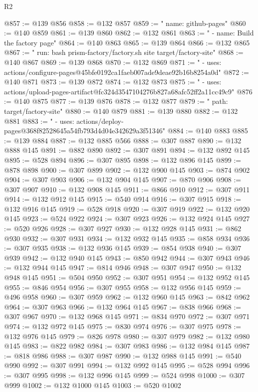\begin{lexlean}{R2}
\begin{coremodule}
@857 := @139 @856
@858 := @132 @857
@859 := "      name: github-pages"
@860 := @140 @859
@861 := @139 @860
@862 := @132 @861
@863 := "      - name: Build the factory page"
@864 := @140 @863
@865 := @139 @864
@866 := @132 @865
@867 := "        run: bash prism-factory/factory.sh site target/factory-site"
@868 := @140 @867
@869 := @139 @868
@870 := @132 @869
@871 := "      - uses: actions/configure-pages@45bfe0192ca1faeb007ade9deae92b16b8254a0d"
@872 := @140 @871
@873 := @139 @872
@874 := @132 @873
@875 := "      - uses: actions/upload-pages-artifact@fc324d3547104276b827a68afc52ff2a11cc49c9"
@876 := @140 @875
@877 := @139 @876
@878 := @132 @877
@879 := "          path: target/factory-site"
@880 := @140 @879
@881 := @139 @880
@882 := @132 @881
@883 := "      - uses: actions/deploy-pages@368f82528645a54fb793d4d04e342629a3f51346"
@884 := @140 @883
@885 := @139 @884
@887 := @132 @885 @566
@888 := @307 @887
@890 := @132 @888 @145
@891 := @882 @890
@892 := @307 @891
@894 := @132 @892 @145
@895 := @528 @894
@896 := @307 @895
@898 := @132 @896 @145
@899 := @878 @898
@900 := @307 @899
@902 := @132 @900 @145
@903 := @874 @902
@904 := @307 @903
@906 := @132 @904 @145
@907 := @870 @906
@908 := @307 @907
@910 := @132 @908 @145
@911 := @866 @910
@912 := @307 @911
@914 := @132 @912 @145
@915 := @540 @914
@916 := @307 @915
@918 := @132 @916 @145
@919 := @528 @918
@920 := @307 @919
@922 := @132 @920 @145
@923 := @524 @922
@924 := @307 @923
@926 := @132 @924 @145
@927 := @520 @926
@928 := @307 @927
@930 := @132 @928 @145
@931 := @862 @930
@932 := @307 @931
@934 := @132 @932 @145
@935 := @858 @934
@936 := @307 @935
@938 := @132 @936 @145
@939 := @854 @938
@940 := @307 @939
@942 := @132 @940 @145
@943 := @850 @942
@944 := @307 @943
@946 := @132 @944 @145
@947 := @814 @946
@948 := @307 @947
@950 := @132 @948 @145
@951 := @504 @950
@952 := @307 @951
@954 := @132 @952 @145
@955 := @846 @954
@956 := @307 @955
@958 := @132 @956 @145
@959 := @496 @958
@960 := @307 @959
@962 := @132 @960 @145
@963 := @842 @962
@964 := @307 @963
@966 := @132 @964 @145
@967 := @838 @966
@968 := @307 @967
@970 := @132 @968 @145
@971 := @834 @970
@972 := @307 @971
@974 := @132 @972 @145
@975 := @830 @974
@976 := @307 @975
@978 := @132 @976 @145
@979 := @826 @978
@980 := @307 @979
@982 := @132 @980 @145
@983 := @822 @982
@984 := @307 @983
@986 := @132 @984 @145
@987 := @818 @986
@988 := @307 @987
@990 := @132 @988 @145
@991 := @540 @990
@992 := @307 @991
@994 := @132 @992 @145
@995 := @528 @994
@996 := @307 @995
@998 := @132 @996 @145
@999 := @524 @998
@1000 := @307 @999
@1002 := @132 @1000 @145
@1003 := @520 @1002

\end{coremodule}
\end{lexlean}
